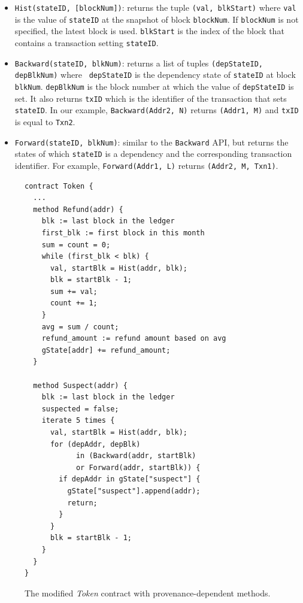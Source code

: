 \begin{itemize}
    \item \texttt{Hist(stateID, [blockNum])}: returns the tuple \texttt{(val, blkStart)} where \texttt{val}
    is the value of \texttt{stateID} at the snapshot of block \texttt{blockNum}. If \texttt{blockNum} is not specified, the latest block is used. \texttt{blkStart} is the index of the block that contains a transaction setting \texttt{stateID}. 

    \item \texttt{Backward(stateID, blkNum)}: returns a list of tuples \texttt{(depStateID, depBlkNum)} where \texttt{ depStateID} is the dependency state of \texttt{stateID} at block \texttt{blkNum}. \texttt{depBlkNum} is the block number at which the value of \texttt{depStateID} is set. It also returns \texttt{txID} which is the identifier of the transaction that sets \texttt{stateID}.
    In our example, \texttt{Backward(Addr2, N)} returns \texttt{(Addr1, M)} and \texttt{txID} is equal to \texttt{Txn2}. 

    \item \texttt{Forward(stateID, blkNum)}: similar to the \texttt{Backward} API, but returns the states of
    which \texttt{stateID} is a dependency and the corresponding transaction identifier. For example, \texttt{Forward(Addr1, L)} returns \texttt{(Addr2, M, Txn1)}.
\end{itemize}

\begin{figure}[t]
\footnotesize
\centering
\begin{verbatim}
contract Token {
  ...
  method Refund(addr) {
    blk := last block in the ledger
    first_blk := first block in this month
    sum = count = 0;
    while (first_blk < blk) {
      val, startBlk = Hist(addr, blk);
      blk = startBlk - 1; 
      sum += val;
      count += 1;
    }
    avg = sum / count;
    refund_amount := refund amount based on avg
    gState[addr] += refund_amount;
  }

  method Suspect(addr) {
    blk := last block in the ledger
    suspected = false;
    iterate 5 times {
      val, startBlk = Hist(addr, blk);
      for (depAddr, depBlk) 
            in (Backward(addr, startBlk) 
            or Forward(addr, startBlk)) {
        if depAddr in gState["suspect"] {
          gState["suspect"].append(addr);
          return;
        }
      }
      blk = startBlk - 1; 
    }
  }
}

\end{verbatim}
\caption{The modified \textit{Token} contract with provenance-dependent methods.}
\label{prov:code:enhanced_contract}
\end{figure}

